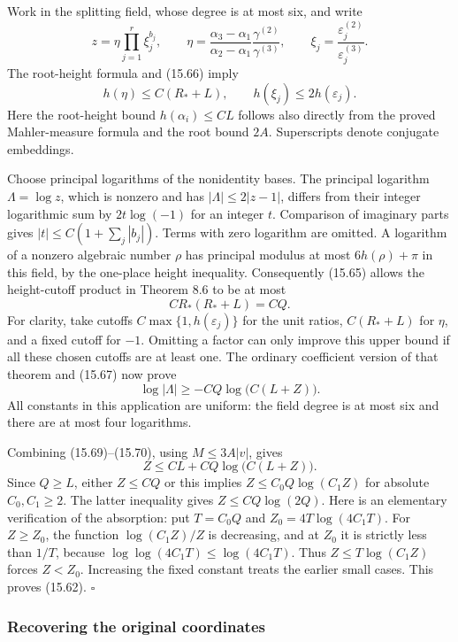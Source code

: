 \documentclass[
  11pt,
  a4paper,
]{article}
\begin{document}
Work in the splitting field, whose degree is at most six, and write \[
z=\eta\prod_{j=1}^r\xi_j^{b_j},\qquad
\eta=\frac{\alpha_3-\alpha_1}{\alpha_2-\alpha_1}
                  \frac{\gamma^{(2)}}{\gamma^{(3)}},
\qquad
\xi_j=\frac{\varepsilon_j^{(2)}}{\varepsilon_j^{(3)}}.
\] The root-height formula and (15.66) imply \[
h(\eta)\le C(R_*+L),\qquad
h(\xi_j)\le2h(\varepsilon_j).
\] Here the root-height bound \(h(\alpha_i)\le CL\) follows also
directly from the proved Mahler-measure formula and the root bound
\(2A\). Superscripts denote conjugate embeddings.

Choose principal logarithms of the nonidentity bases. The principal
logarithm \(\Lambda=\log z\), which is nonzero and has
\(|\Lambda|\le2|z-1|\), differs from their integer logarithmic sum by
\(2t\log(-1)\) for an integer \(t\). Comparison of imaginary parts gives
\(|t|\le C(1+\sum_j|b_j|)\). Terms with zero logarithm are omitted. A
logarithm of a nonzero algebraic number \(\rho\) has principal modulus
at most \(6h(\rho)+\pi\) in this field, by the one-place height
inequality. Consequently (15.65) allows the height-cutoff product in
Theorem 8.6 to be at most \[
C R_*(R_*+L)=CQ.
\] For clarity, take cutoffs \(C\max\{1,h(\varepsilon_j)\}\) for the
unit ratios, \(C(R_*+L)\) for \(\eta\), and a fixed cutoff for \(-1\).
Omitting a factor can only improve this upper bound if all these chosen
cutoffs are at least one. The ordinary coefficient version of that
theorem and (15.67) now prove \[
\log|\Lambda|\ge -CQ\log\bigl(C(L+Z)\bigr).
\tag{15.70}
\] All constants in this application are uniform: the field degree is at
most six and there are at most four logarithms.

Combining (15.69)--(15.70), using \(M\le3A|v|\), gives \[
Z\le CL+CQ\log\bigl(C(L+Z)\bigr).
\] Since \(Q\ge L\), either \(Z\le CQ\) or this implies
\(Z\le C_0Q\log(C_1Z)\) for absolute \(C_0,C_1\ge2\). The latter
inequality gives \(Z\le C Q\log(2Q)\). Here is an elementary
verification of the absorption: put \(T=C_0Q\) and
\(Z_0=4T\log(4C_1T)\). For \(Z\ge Z_0\), the function \(\log(C_1Z)/Z\)
is decreasing, and at \(Z_0\) it is strictly less than \(1/T\), because
\(\log\log(4C_1T)\le\log(4C_1T)\). Thus \(Z\le T\log(C_1Z)\) forces
\(Z<Z_0\). Increasing the fixed constant treats the earlier small cases.
This proves (15.62). \(\square\)

\subsubsection{Recovering the original
coordinates}\label{recovering-the-original-coordinates}
\end{document}

